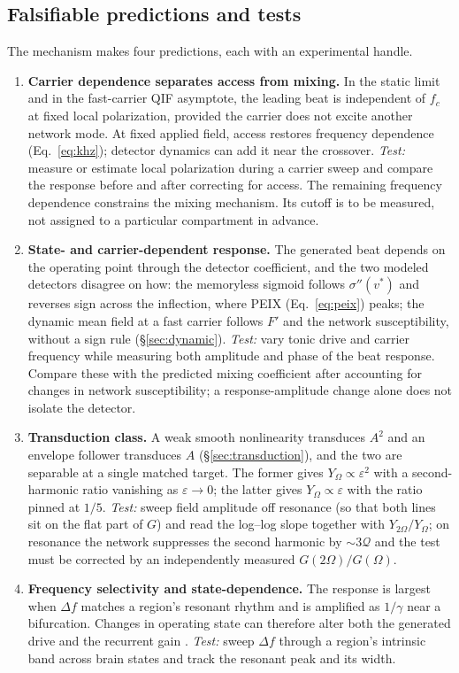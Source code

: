 \documentclass[11pt,a4paper]{article}
\newcommand{\Sig}{\sigma}
\begin{document}
\subsection{Falsifiable predictions and tests}\label{sec:predictions}
The mechanism makes four predictions, each with an experimental handle.
\begin{enumerate}[leftmargin=*]
\item \textbf{Carrier dependence separates access from mixing.} In the static limit
and in the fast-carrier QIF asymptote, the leading beat is independent of $f_c$ at
fixed local polarization, provided the carrier does not excite another network mode.
At fixed applied field, access restores frequency dependence
(Eq.~\eqref{eq:khz}); detector dynamics can add it near the crossover.
\emph{Test:} measure or estimate local polarization during a carrier sweep and
compare the response before and after correcting for access. The remaining
frequency dependence constrains the mixing mechanism. Its cutoff is to be
measured, not assigned to a particular compartment in advance.
\item \textbf{State- and carrier-dependent response.} The generated beat depends on
the operating point through the detector coefficient, and the two modeled detectors
disagree on how: the memoryless sigmoid follows $\Sig''(v^*)$ and reverses sign across the
inflection, where PEIX (Eq.~\eqref{eq:peix}) peaks; the dynamic mean field at a fast
carrier follows $F'$ and the network susceptibility, without a sign rule
(\S\ref{sec:dynamic}). \emph{Test:} vary tonic drive and carrier frequency while
measuring both amplitude and phase of the beat response. Compare these with the
predicted mixing coefficient after accounting for changes in network susceptibility;
a response-amplitude change alone does not isolate the detector.
\item \textbf{Transduction class.} A weak smooth nonlinearity transduces $A^2$ and an
envelope follower transduces $A$ (\S\ref{sec:transduction}), and the two are separable at a
single matched target. The former gives $Y_\Omega\propto\varepsilon^2$ with a second-harmonic
ratio vanishing as $\varepsilon\!\to\!0$; the latter gives $Y_\Omega\propto\varepsilon$ with
the ratio pinned at $1/5$. \emph{Test:} sweep field amplitude off resonance (so that both
lines sit on the flat part of $G$) and read the log--log slope together with
$Y_{2\Omega}/Y_\Omega$; on resonance the network suppresses the second harmonic by
$\sim3\mathcal{Q}$ and the test must be corrected by an independently measured
$G(2\Omega)/G(\Omega)$.

\item \textbf{Frequency selectivity and state-dependence.} The response is largest
when $\Delta f$ matches a region's resonant rhythm and is amplified as $1/\gamma$ near
a bifurcation. Changes in operating state can therefore alter both the generated
drive and the recurrent gain \cite{ruffini2025cfc}. \emph{Test:}
sweep $\Delta f$ through a region's intrinsic band across brain states and track the
resonant peak and its width.
\end{enumerate}
\end{document}
